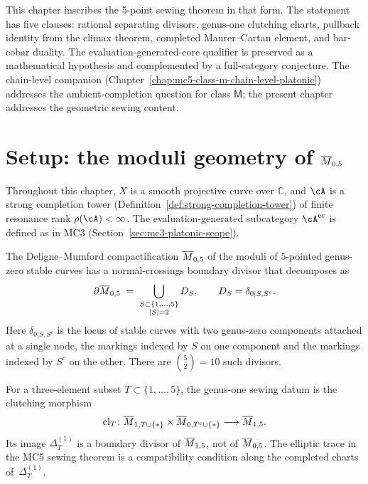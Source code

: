 This chapter inscribes the 5-point sewing theorem in that form. The
statement has five clauses: rational separating divisors, genus-one
clutching charts, pullback identity from the climax theorem, completed
Maurer--Cartan element, and bar-cobar duality. The
evaluation-generated-core qualifier is preserved as a mathematical
hypothesis and complemented by a full-category conjecture. The
chain-level companion
\textup{(}Chapter~\ref{chap:mc5-class-m-chain-level-platonic}\textup{)}
addresses the ambient-completion question for class $\mathsf{M}$; the
present chapter addresses the geometric sewing content.

\section{Setup: the moduli geometry of \texorpdfstring{$\overline{M}_{0,5}$}{Mbar(0,5)}}
\label{sec:mc5-g0g1-setup}

Throughout this chapter, $X$ is a smooth projective curve over
$\mathbb{C}$, and $\cA$ is a strong completion tower
\textup{(}Definition~\ref{def:strong-completion-tower}\textup{)} of finite
resonance rank $\rho(\cA) < \infty$. The evaluation-generated subcategory
$\cA^{\evcore}$ is defined as in MC3
\textup{(}Section~\ref{sec:mc3-platonic-scope}\textup{)}.

\begin{definition}
\label{def:mbar-05-boundary-g0g1-wall}
The Deligne--Mumford compactification $\overline{M}_{0,5}$ of the moduli of
$5$-pointed genus-zero stable curves has a normal-crossings boundary
divisor that decomposes as
\begin{equation}
\label{eq:mbar-05-boundary-decomposition}
\partial \overline{M}_{0,5}
\;=\;
\bigcup_{\substack{S \subset \{1,\dots,5\} \\ |S| = 2}}
D_{S},
\qquad
D_{S}=\delta_{0|S,S^c}.
\end{equation}
Here $\delta_{0|S, S^c}$ is the locus of stable curves with two
genus-zero components attached at a single node, the markings indexed by
$S$ on one component and the markings indexed by $S^c$ on the other.
There are $\binom{5}{2}=10$ such divisors.

For a three-element subset $T\subset\{1,\ldots,5\}$, the genus-one
sewing datum is the clutching morphism
\begin{equation}\label{eq:mc5-genus-one-clutching}
\mathrm{cl}_{T}\colon
\overline{M}_{1,T\cup\{*\}}\times \overline{M}_{0,T^{c}\cup\{*\}}
\longrightarrow \overline{M}_{1,5}.
\end{equation}
Its image $\Delta^{(1)}_{T}$ is a boundary divisor of
$\overline{M}_{1,5}$, not of $\overline{M}_{0,5}$. The elliptic trace in the MC5
sewing theorem is a compatibility condition along the completed charts
of~$\Delta^{(1)}_{T}$.
\end{definition}

